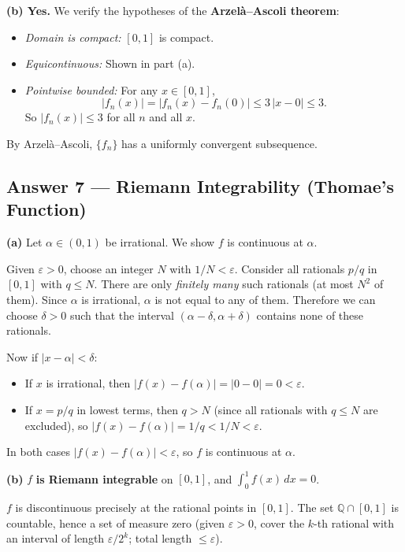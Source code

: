 \documentclass[10pt]{article}
\newcommand{\Q}{\mathbb{Q}}
\newcommand{\eps}{\varepsilon}
\begin{document}
\medskip

\textbf{(b) Yes.} We verify the hypotheses of the \textbf{Arzel\`a--Ascoli theorem}:

\begin{itemize}
  \item \emph{Domain is compact:} $[0,1]$ is compact.
  \item \emph{Equicontinuous:} Shown in part (a).
  \item \emph{Pointwise bounded:} For any $x \in [0,1]$,
  $$
  |f_n(x)| = |f_n(x) - f_n(0)| \leq 3\,|x - 0| \leq 3.
  $$
  So $|f_n(x)| \leq 3$ for all $n$ and all $x$.
\end{itemize}

By Arzel\`a--Ascoli, $\{f_n\}$ has a uniformly convergent subsequence.

\subsection{Answer 7 --- Riemann Integrability (Thomae's Function)}

\textbf{(a)} Let $\alpha \in (0,1)$ be irrational. We show $f$ is continuous at $\alpha$.

Given $\eps > 0$, choose an integer $N$ with $1/N < \eps$. Consider all rationals $p/q$ in $[0,1]$ with $q \leq N$. There are only \emph{finitely many} such rationals (at most $N^2$ of them). Since $\alpha$ is irrational, $\alpha$ is not equal to any of them. Therefore we can choose $\delta > 0$ such that the interval $(\alpha - \delta, \alpha + \delta)$ contains none of these rationals.

Now if $|x - \alpha| < \delta$:
\begin{itemize}
  \item If $x$ is irrational, then $|f(x) - f(\alpha)| = |0 - 0| = 0 < \eps$.
  \item If $x = p/q$ in lowest terms, then $q > N$ (since all rationals with $q \leq N$ are excluded), so $|f(x) - f(\alpha)| = 1/q < 1/N < \eps$.
\end{itemize}

In both cases $|f(x) - f(\alpha)| < \eps$, so $f$ is continuous at $\alpha$.

\medskip

\textbf{(b)} $f$ \textbf{is Riemann integrable} on $[0,1]$, and $\displaystyle\int_0^1 f(x)\,dx = 0$.

$f$ is discontinuous precisely at the rational points in $[0,1]$. The set $\Q \cap [0,1]$ is countable, hence a set of measure zero (given $\eps > 0$, cover the $k$-th rational with an interval of length $\eps/2^k$; total length $\leq \eps$).
\end{document}

